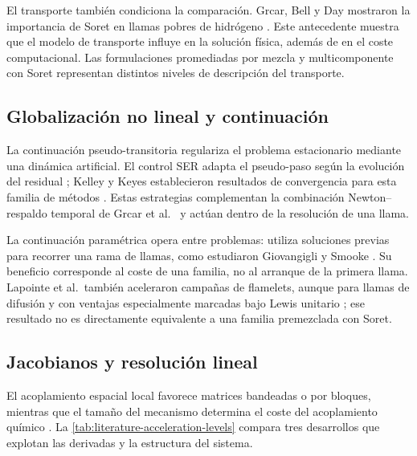 \documentclass[12pt,a4paper,twoside,openany]{book}
\begin{document}
El transporte también condiciona la comparación. Grcar, Bell y Day mostraron
la importancia de Soret en llamas pobres de hidrógeno \cite{GrcarSoret2009}.
Este antecedente muestra que el modelo de transporte influye en la solución
física, además de en el coste computacional. Las formulaciones promediadas por
mezcla y multicomponente con Soret representan distintos niveles de descripción
del transporte.

\subsection{Globalización no lineal y continuación}
\label{sec:nonlinear-globalization}

La continuación pseudo-transitoria regulariza el problema estacionario mediante
una dinámica artificial. El control SER adapta el pseudo-paso según la evolución
del residual \cite{MulderVanLeer1985,Mulder1985}; Kelley y Keyes establecieron
resultados de convergencia para esta familia de métodos \cite{KelleyKeyes1998}.
Estas estrategias complementan la combinación Newton--respaldo temporal de
Grcar et al.\ \cite{Grcar1988} y actúan dentro de la resolución de una llama.

La continuación paramétrica opera entre problemas: utiliza soluciones previas
para recorrer una rama de llamas, como estudiaron Giovangigli y Smooke
\cite{GiovangigliSmooke1993}. Su beneficio corresponde al coste de una familia,
no al arranque de la primera llama. Lapointe et al.\ también aceleraron campañas
de flamelets, aunque para llamas de difusión y con ventajas especialmente
marcadas bajo Lewis unitario \cite{LapointeFlamelet2020}; ese resultado no es
directamente equivalente a una familia premezclada con Soret.

\subsection{Jacobianos y resolución lineal}
\label{sec:jacobians-linear-solvers}

El acoplamiento espacial local favorece matrices bandeadas o por bloques,
mientras que el tamaño del mecanismo determina el coste del acoplamiento
químico \cite{KeePremix1998,Lapointe2019}. La
\cref{tab:literature-acceleration-levels} compara tres desarrollos que explotan
las derivadas y la estructura del sistema.
\end{document}
